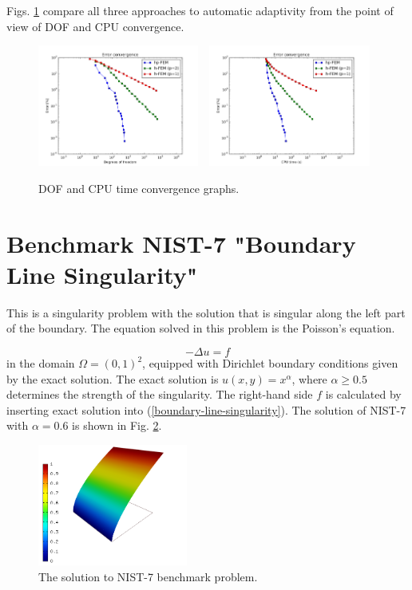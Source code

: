 \documentclass[12pt]{elsarticle}
\begin{document}
Figs. \ref{fig:nist-6-conv} compare all
three approaches to automatic adaptivity from the point
of view of DOF and CPU convergence.

\begin{figure}[H]
\centering
\includegraphics[height=4cm]{nist/nist-6/conv_dof_aniso.png}\ \
\includegraphics[height=4cm]{nist/nist-6/conv_cpu_aniso.png}
\caption{DOF and CPU time convergence graphs.}
\label{fig:nist-6-conv}
\end{figure}


\section{Benchmark NIST-7 "Boundary Line Singularity"}
\label{sec:bench-7}

This is a singularity problem with the solution that is singular along the left part of the boundary.
The equation solved in this problem is the Poisson's equation.

\begin{equation} \label{boundary-line-singularity}
-\Delta u = f
\end{equation}
in the domain $\Omega = (0, 1)^2$, equipped with Dirichlet boundary conditions
given by the exact solution. The exact solution is
$u(x,y) = x^{\alpha}$,
where $\alpha \geq 0.5$ determines the strength of the singularity.
The right-hand side $f$ is calculated by inserting exact solution into (\ref{boundary-line-singularity}).
The solution of NIST-7 with $\alpha = 0.6$ is shown in Fig. \ref{fig:sln-nist07}.

\begin{figure}[!ht]
\centering
\includegraphics[height=4cm]{nist/nist-7/solution.png}
\caption{The solution to NIST-7 benchmark problem.}
\label{fig:sln-nist07}
\end{figure}
\end{document}
